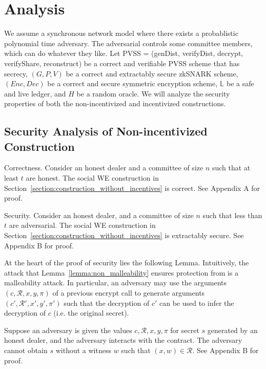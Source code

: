 \section{Analysis}
We assume a synchronous network model where there exists a probablistic polynomial time adversary.
The adversarial controls some committee members, which can do whatever they like.
Let \textsf{PVSS} = (\textsf{genDist}, \textsf{verifyDist}, \textsf{decrypt}, \textsf{verifyShare}, \textsf{reconstruct}) be a correct and verifiable PVSS scheme that has secrecy,
$(G, P, V)$ be a correct and extractably secure zkSNARK scheme, $(Enc, Dec)$ be a correct and secure symmetric encryption scheme,
$\mathbb{L}$ be a safe and live ledger, and $H$ be a random oracle.
We will analyze the security properties of both the non-incentivized and incentivized constructions.

\subsection{Security Analysis of Non-incentivized Construction}
\begin{theorem}{Correctness.}\label{thm:correctness_hm}
    Consider an honest dealer and a committee of size $n$ such that at least $t$ are honest.
    The social WE construction in Section~\ref{section:construction_without_incentives} is correct.
    See Appendix A for proof.
\end{theorem}

\begin{theorem}{Security.}\label{thm:security_hm}
    Consider an honest dealer, and a committee of size $n$ such that less than $t$ are adversarial.
    The social WE construction in Section~\ref{section:construction_without_incentives} is extractably secure.
    See Appendix B for proof.
\end{theorem}

At the heart of the proof of security lies the following Lemma.
Intuitively, the attack that Lemma~\ref{lemma:non_malleability} ensures protection from is a malleability attack.
In particular, an adversary may use the arguments $(c, \mathcal{R}, x, y, \pi)$ of a previous \textsf{encrypt} call to generate arguments $(c', \mathcal{R}', x', y', \pi')$ such that the decryption of $c'$ can be used to infer the decryption of $c$ (i.e. the original secret).

\begin{lemma}\label{lemma:non_malleability}
    Suppose an adversary is given the values $c, \mathcal{R}, x, y, \pi$ for secret $s$ generated by an honest dealer, and the adversary interacts with the contract.
    The adversary cannot obtain $s$ without a witness $w$ such that $(x, w) \in \mathcal{R}$. See Appendix B for proof.
\end{lemma}

